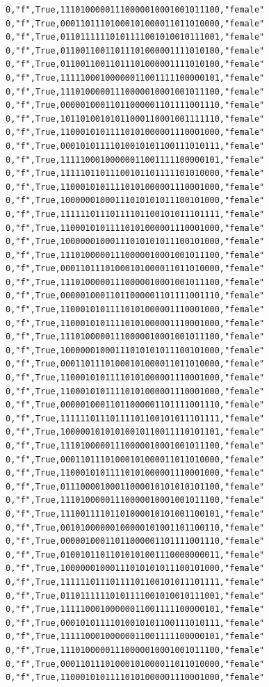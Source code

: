 \documentclass[authoryearcitations]{UoYCSproject}
\begin{document}
\begin{framed}
\begin{verbatim}
0,"f",True,11101000001110000010001001011100,"female"
0,"f",True,00011011101000101000011011010000,"female"
0,"f",True,01101111110101111001010010111001,"female"
0,"f",True,01100110011011101000001111010100,"female"
0,"f",True,01100110011011101000001111010100,"female"
0,"f",True,11111000100000011001111100000101,"female"
0,"f",True,11101000001110000010001001011100,"female"
0,"f",True,00000100011011000001101111001110,"female"
0,"f",True,10110100101011000110001001111110,"female"
0,"f",True,11000101011110101000001110001000,"female"
0,"f",True,00010101111010010101100111010111,"female"
0,"f",True,11111000100000011001111100000101,"female"
0,"f",True,11111011011100101101111101010000,"female"
0,"f",True,11000101011110101000001110001000,"female"
0,"f",True,10000001000111010101011100101000,"female"
0,"f",True,11111101110111101100101011101111,"female"
0,"f",True,11000101011110101000001110001000,"female"
0,"f",True,10000001000111010101011100101000,"female"
0,"f",True,11101000001110000010001001011100,"female"
0,"f",True,00011011101000101000011011010000,"female"
0,"f",True,11101000001110000010001001011100,"female"
0,"f",True,00000100011011000001101111001110,"female"
0,"f",True,11000101011110101000001110001000,"female"
0,"f",True,11000101011110101000001110001000,"female"
0,"f",True,11101000001110000010001001011100,"female"
0,"f",True,10000001000111010101011100101000,"female"
0,"f",True,00011011101000101000011011010000,"female"
0,"f",True,11000101011110101000001110001000,"female"
0,"f",True,11000101011110101000001110001000,"female"
0,"f",True,00000100011011000001101111001110,"female"
0,"f",True,11111101110111101100101011101111,"female"
0,"f",True,10000010101010010110011110101101,"female"
0,"f",True,11101000001110000010001001011100,"female"
0,"f",True,00011011101000101000011011010000,"female"
0,"f",True,11000101011110101000001110001000,"female"
0,"f",True,01110000100011000010101010101100,"female"
0,"f",True,11101000001110000010001001011100,"female"
0,"f",True,11100111101101000010101001100101,"female"
0,"f",True,00101000000100000101001101100110,"female"
0,"f",True,00000100011011000001101111001110,"female"
0,"f",True,01001011011010101001110000000011,"female"
0,"f",True,10000001000111010101011100101000,"female"
0,"f",True,11111101110111101100101011101111,"female"
0,"f",True,01101111110101111001010010111001,"female"
0,"f",True,11111000100000011001111100000101,"female"
0,"f",True,00010101111010010101100111010111,"female"
0,"f",True,11111000100000011001111100000101,"female"
0,"f",True,11101000001110000010001001011100,"female"
0,"f",True,00011011101000101000011011010000,"female"
0,"f",True,11000101011110101000001110001000,"female"

\end{verbatim}
\end{framed}
\end{document}
